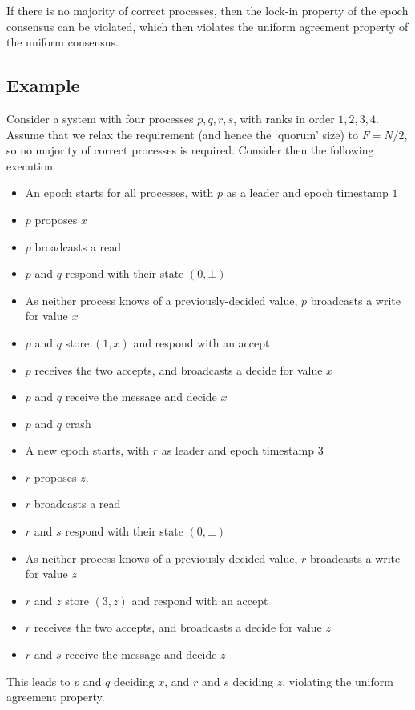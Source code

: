 \documentclass[a4paper]{scrreprt}
\begin{document}
If there is no majority of correct processes, then the lock-in property of the
epoch consensus can be violated, which then violates the uniform agreement
property of the uniform consensus.

\subsection{Example}

Consider a system with four processes $p, q, r, s$, with ranks in order $1, 2,
3, 4$. Assume that we relax the requirement (and hence the `quorum' size) to $F =
N/2$, so no majority of correct processes is required. Consider then the
following execution.

\begin{itemize}
	\item An epoch starts for all processes, with $p$ as a leader and epoch
		timestamp $1$
	\item $p$ proposes $x$
	\item $p$ broadcasts a read
	\item $p$ and $q$ respond with their state $(0, \bot)$
	\item As neither process knows of a previously-decided value, $p$
		broadcasts a write for value $x$
	\item $p$ and $q$ store $(1, x)$ and respond with an accept
	\item $p$ receives the two accepts, and broadcasts a decide for value
		$x$
	\item $p$ and $q$ receive the message and decide $x$
	\item $p$ and $q$ crash
	\item A new epoch starts, with $r$ as leader and epoch timestamp $3$
	\item $r$ proposes $z$.
	\item $r$ broadcasts a read
	\item $r$ and $s$ respond with their state $(0, \bot)$
	\item As neither process knows of a previously-decided value, $r$
		broadcasts a write for value $z$
	\item $r$ and $z$ store $(3, z)$ and respond with an accept
	\item $r$ receives the two accepts, and broadcasts a decide for value
		$z$
	\item $r$ and $s$ receive the message and decide $z$
\end{itemize}

This leads to $p$ and $q$ deciding $x$, and $r$ and $s$ deciding $z$, violating
the uniform agreement property.
\end{document}
